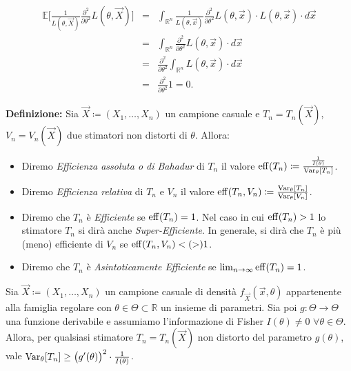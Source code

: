 \begin{itemize}
\begin{eqnarray*}
\mathbb{E}\Big[\frac{1}{L(\theta,\vec{X})}\frac{\partial^2}{\partial\theta^2}L(\theta,\vec{X})\Big]
&=& \int_{\mathbb{R}^n} \frac{1}{L(\theta,\vec{x})}\frac{\partial^2}{\partial\theta^2}L(\theta,\vec{x})\cdot L(\theta,\vec{x})\cdot d\vec{x} \\
&=& \int_{\mathbb{R}^n} \frac{\partial^2}{\partial\theta^2}L(\theta,\vec{x})\cdot d\vec{x} \\
&=& \frac{\partial^2}{\partial\theta^2}\int_{\mathbb{R}^n} L(\theta,\vec{x})\cdot d\vec{x} \\
&=& \frac{\partial^2}{\partial\theta^2} 1=0.
\end{eqnarray*}
\end{itemize}
\textbf{Definizione:} Sia $\vec{X}\coloneqq (X_1,\ldots,X_n)$ un campione casuale e $T_n=T_n(\vec{X})$, $V_n=V_n(\vec{X})$ due stimatori non distorti di $\theta$. Allora:
\begin{itemize}[noitemsep]
\item Diremo \textit{Efficienza assoluta o di Bahadur} di $T_n$ il valore $\operatorname{eff}(T_n)\coloneqq \frac{\frac{1}{I(\theta)}}{\operatorname{Var}_\theta[T_n]}$.
\item Diremo \textit{Efficienza relativa} di $T_n$ e $V_n$ il valore $\operatorname{eff}(T_n,V_n)\coloneqq \frac{\operatorname{Var}_\theta[T_n]}{\operatorname{Var}_\theta[V_n]}$.
\item Diremo che $T_n$ è \textit{Efficiente} se $\operatorname{eff}(T_n)=1$. Nel caso in cui $\operatorname{eff}(T_n)>1$ lo stimatore $T_n$ si dirà anche \textit{Super-Efficiente}. In generale, si dirà che $T_n$ è più (meno) efficiente di $V_n$ se $\operatorname{eff}(T_n,V_n)< (>)1$.
\item Diremo che $T_n$ è \textit{Asintoticamente Efficiente} se $\lim_{n\rightarrow\infty} \operatorname{eff}(T_n)=1$.
\end{itemize}
\begin{teo}
Sia $\vec{X}\coloneqq (X_1,\ldots,X_n)$ un campione casuale di densità $f_{\vec{X}}(\vec{x},\theta)$ appartenente alla famiglia regolare con $\theta\in \Theta \subset \mathbb{R}$ un insieme di parametri. Sia poi $g:\Theta\longrightarrow \Theta$ una funzione derivabile e assumiamo l'informazione di Fisher $I(\theta)\neq 0$ $\forall \theta\in \Theta$. Allora, per qualsiasi stimatore $T_n=T_n(\vec{X})$ non distorto del parametro $g(\theta)$, vale $\operatorname{Var}_\theta[T_n]\geq \big(g'(\theta)\big)^2\cdot\frac{1}{I(\theta)}$.
\end{teo}

